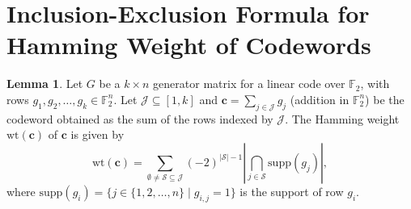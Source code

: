 \documentclass[conference]{IEEEtran}
\theoremstyle{definition}
\newtheorem{lemma}{Lemma}
\begin{document}
\clearpage






\clearpage
\appendices

\section{Inclusion-Exclusion Formula for Hamming Weight of Codewords}

\begin{lemma}\label{lem:pie}
Let $G$ be a $k \times n$ generator matrix for a linear code over $\mathbb{F}_2$, with rows $g_1, g_2, \dots, g_k \in \mathbb{F}_2^n$. Let $\mathcal{J} \subseteq [1,k]$ and $\mathbf{c} = \sum_{j \in \mathcal{J}} g_j$ (addition in $\mathbb{F}_2^n$) be the codeword obtained as the sum of the rows indexed by $\mathcal{J}$. The Hamming weight $\mathrm{wt}(\mathbf{c})$ of $\mathbf{c}$ is given by
\begin{equation}\label{eq:pie_codeword}
\boxed{\;\mathrm{wt}(\mathbf{c}) = \sum_{\emptyset \neq \mathcal{S} \subseteq \mathcal{J}} (-2)^{|\mathcal{S}|-1} \left| \bigcap_{j \in \mathcal{S}} \mathrm{supp}(g_j) \right|,\;}
\end{equation}
where $\mathrm{supp}(g_i) = \{ j \in \{1,2,\dots,n\} \mid g_{i,j} = 1 \}$ is the support of row $g_i$.
\end{lemma}
\end{document}
